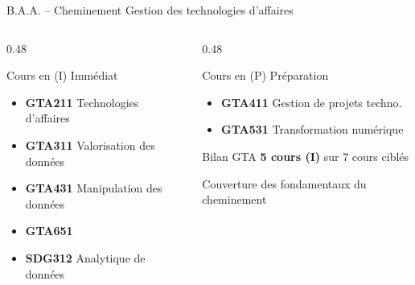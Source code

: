 \documentclass[aspectratio=169,11pt]{beamer}
\begin{document}
\begin{frame}{B.A.A. -- Cheminement Gestion des technologies d'affaires}
  \small
  \begin{columns}[T]
    \begin{column}{0.48\textwidth}
      \begin{block}{Cours en (I) Immédiat}
        \begin{itemize}
          \item[\textcolor{immediatgreen}{I}] \textbf{GTA211} Technologies d'affaires
          \item[\textcolor{immediatgreen}{I}] \textbf{GTA311} Valorisation des données
          \item[\textcolor{immediatgreen}{I}] \textbf{GTA431} Manipulation des données
          \item[\textcolor{immediatgreen}{I}] \textbf{GTA651} 
          \item[\textcolor{immediatgreen}{I}] \textbf{SDG312} Analytique de données
        \end{itemize}
      \end{block}
    \end{column}
    \begin{column}{0.48\textwidth}
      \begin{block}{Cours en (P) Préparation}
        \begin{itemize}
          \item[\textcolor{prepareorange}{P}] \textbf{GTA411} Gestion de projets techno.
          \item[\textcolor{prepareorange}{P}] \textbf{GTA531} Transformation numérique
        \end{itemize}
      \end{block}
      
      \vspace{0.5em}
      
      \begin{alertblock}{Bilan GTA}
        \centering
        \textbf{5 cours (I)} sur 7 cours ciblés
        
        \vspace{0.3em}
        
        {\small Couverture des fondamentaux du cheminement}
      \end{alertblock}
    \end{column}
  \end{columns}
\end{frame}
\end{document}
